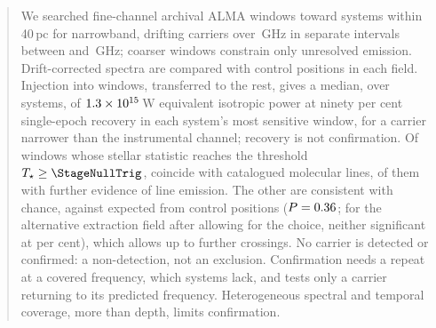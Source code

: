 \begin{abstract}
We searched \NWinA{} fine-channel archival ALMA windows toward
\NSysClassA{} systems within 40\,pc for narrowband, drifting carriers over \CvUnionA\,GHz in
\CovNIslands{} separate intervals between \SurvFreqLoA{} and
\SurvFreqHiA\,GHz; \NWinB{}
coarser windows constrain only unresolved emission. Drift-corrected spectra
are compared with control positions in each field. Injection into
\SensNInj{} windows, transferred to the rest, gives a median, over systems,
of $\EirpNinetySysMedA$\,W equivalent isotropic power at ninety
per cent single-epoch recovery in each system's most sensitive window,
for a carrier narrower than the instrumental channel;
recovery is not confirmation. Of \CsNCross{} windows whose stellar
statistic reaches the threshold $T_\star\geq\StageNullTrig$, \MkNCoinc{}
coincide with catalogued molecular lines, \LnAttrSupp{} of them with further
evidence of line emission. The other \CeObs{} are consistent with chance,
against \CeExp{} expected from control positions ($P=\CeProbNull$;
\FrTwoTrialP{} for the alternative extraction field after allowing for the
choice, neither significant at \CeAlphaPct{} per cent),
which allows up to \CeAddLim{} further crossings. No carrier is detected or
confirmed: a non-detection, not an exclusion. Confirmation needs a repeat at
a covered frequency, which \ZcNoRepSys{} systems lack, and tests only a
carrier returning to its predicted frequency. Heterogeneous spectral and
temporal coverage, more than depth, limits confirmation.
\end{abstract}


